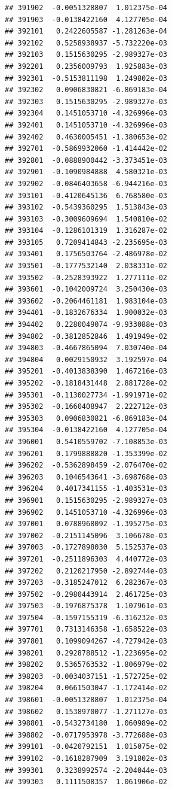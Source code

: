 \documentclass[ignorenonframetext,]{beamer}
\begin{document}
\begin{frame}[fragile]
\begin{verbatim}
## 391902  -0.0051328807  1.012375e-04
## 391903  -0.0138422160  4.127705e-04
## 392101   0.2422605587 -1.281263e-04
## 392102   0.5258938937 -5.732220e-03
## 392103   0.1515630295 -2.989327e-03
## 392201   0.2356009793  1.925883e-03
## 392301  -0.5153811198  1.249802e-03
## 392302   0.0906830821 -6.869183e-04
## 392303   0.1515630295 -2.989327e-03
## 392304   0.1451053710 -4.326996e-03
## 392401   0.1451053710 -4.326996e-03
## 392402   0.4630005451 -1.380653e-02
## 392701  -0.5869932060 -1.414442e-02
## 392801  -0.0888900442 -3.373451e-03
## 392901  -0.1090984888  4.580321e-03
## 392902  -0.0846403658 -6.944216e-03
## 393101  -0.4120645136  6.768580e-03
## 393102  -0.5439360295  1.513843e-03
## 393103  -0.3009609694  1.540810e-02
## 393104  -0.1286101319  1.316287e-02
## 393105   0.7209414843 -2.235695e-03
## 393401   0.1756503764 -2.486978e-02
## 393501  -0.1777532140  2.038331e-02
## 393502  -0.2528393922  1.277111e-02
## 393601  -0.1042009724  3.250430e-03
## 393602  -0.2064461181  1.983104e-03
## 394401  -0.1832676334  1.900032e-03
## 394402   0.2280049074 -9.933088e-03
## 394802  -0.3812852846  1.491949e-02
## 394803  -0.4667865094  7.030740e-04
## 394804   0.0029150932  3.192597e-04
## 395201  -0.4013838390  1.467216e-03
## 395202  -0.1818431448  2.881728e-02
## 395301  -0.1130027734 -1.991971e-02
## 395302  -0.1660408947  2.222712e-03
## 395303   0.0906830821 -6.869183e-04
## 395304  -0.0138422160  4.127705e-04
## 396001   0.5410559702 -7.108853e-03
## 396201   0.1799888820 -1.353399e-02
## 396202  -0.5362898459 -2.076470e-02
## 396203   0.1046543641 -3.698768e-03
## 396204   0.4017341155 -1.403531e-03
## 396901   0.1515630295 -2.989327e-03
## 396902   0.1451053710 -4.326996e-03
## 397001   0.0788968092 -1.395275e-03
## 397002  -0.2151145096  3.106678e-03
## 397003  -0.1727898030  5.152537e-03
## 397201  -0.2511896303  4.440772e-03
## 397202   0.2120217950 -2.892744e-03
## 397203  -0.3185247012  6.282367e-03
## 397502  -0.2980443914  2.461725e-03
## 397503  -0.1976875378  1.107961e-03
## 397504  -0.1597155319 -6.316232e-03
## 397701   0.7313146358 -1.658522e-03
## 397801   0.1099094267 -4.727942e-03
## 398201   0.2928788512 -1.223695e-02
## 398202   0.5365763532 -1.806979e-02
## 398203  -0.0034037151 -1.572725e-02
## 398204   0.0661503047 -1.172414e-02
## 398601  -0.0051328807  1.012375e-04
## 398602   0.1538970077 -1.271127e-03
## 398801  -0.5432734180  1.060989e-02
## 398802  -0.0717953978 -3.772688e-03
## 399101  -0.0420792151  1.015075e-02
## 399102  -0.1618287909  3.191802e-03
## 399301   0.3238992574 -2.204044e-03
## 399303   0.1111508357  1.061906e-02

\end{verbatim}
\end{frame}
\end{document}
